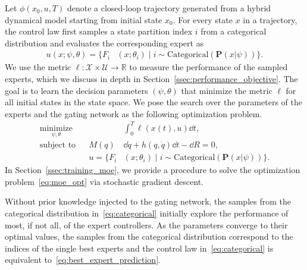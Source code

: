 %
Let $\phi(x_0, u, T)$ denote a closed-loop trajectory generated from a hybrid
dynamical model starting from initial state $x_0$.
%
For every state $x$ in a trajectory, the control law first samples a state
partition index $i$ from a categorical distribution and evaluates the
corresponding expert as
\begin{align}
    u(x; \psi, \theta) = \{F_i&(x; \theta_i) \; | \; i  \sim \text{Categorical} (\mathbf{P}(x| \psi)) \}.
    \label{eq:categorical}
\end{align} 
%
We use the metric $\ell : \mathcal{X} \times \mathcal{U} \rightarrow
\mathbb{R}$ to measure the performance of the sampled experts, which we discuss
in depth in Section~\ref{ssec:performance_objective}.
%
%
The goal is to learn the decision parameters $(\psi, \theta)$ that minimize the
metric $\ell$ for all initial states in the state space.
%
We pose the search over the parameters of the experts and the gating network as the following optimization problem.
\begin{equation}
    \begin{aligned}
        \underset{\psi, \theta}{\textrm{minimize}} 
        & & &\int_0^T \ell (x(t),u) \dd t , \\%
        \textrm{subject to}
        & & M(q) &\dd \dot{q} + h(q, \dot{q})\dd t - \dd R  = 0,\\%
        & & u = \{F_i&(x; \theta_i) \; | \; i  \sim \text{Categorical} (\mathbf{P}(x| \psi)) \}.
    \end{aligned}
    \label{eq:moe_opt}
\end{equation}
%
In Section~\ref{ssec:training_moe}, we provide a procedure to solve the
optimization problem~\eqref{eq:moe_opt} via stochastic gradient descent. 
\begin{rem}
    Without prior knowledge injected to the gating network, the samples from the
    categorical distribution in~\eqref{eq:categorical} initially explore the
    performance of most, if not all, of the expert controllers.
    As the parameters converge to their optimal values, the samples from the
    categorical distribution correspond to the indices of the single best
    experts and the control law in~\eqref{eq:categorical} is equivalent
    to~\eqref{eq:best_expert_prediction}.
\end{rem}

